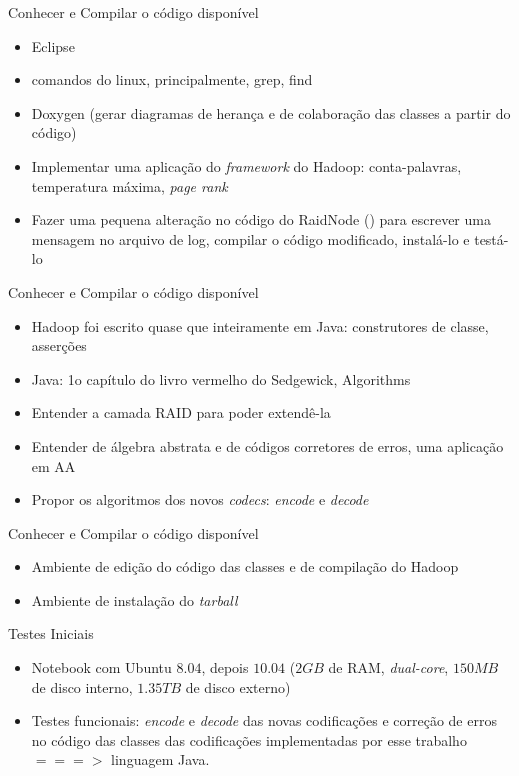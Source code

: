   \begin{frame}{Conhecer e Compilar o código disponível}
     \begin{itemize}
        \item<1-> Eclipse
        \item<2-> comandos do linux, principalmente, grep, find
        \item<3-> Doxygen (gerar diagramas de herança e de colaboração das classes a partir do código)
        \item<4-> Implementar uma aplicação do \emph{framework} do Hadoop: conta-palavras, temperatura máxima, \emph{page rank}
        \item<5-> Fazer uma pequena alteração no código do RaidNode () para escrever uma mensagem no arquivo de log, compilar o código modificado, instalá-lo e testá-lo
     \end{itemize}
  \end{frame}

  \begin{frame}{Conhecer e Compilar o código disponível}
     \begin{itemize}
        \item<1-> Hadoop foi escrito quase que inteiramente em Java: construtores de classe, asserções
        \item<2-> Java: 1o capítulo do livro vermelho do Sedgewick, Algorithms
        \item<3-> Entender a camada RAID para poder extendê-la
        \item<4-> Entender de álgebra abstrata e de códigos corretores de erros, uma aplicação em AA
        \item<5-> Propor os algoritmos dos novos \emph{codecs}: \emph{encode} e \emph{decode}
     \end{itemize}
  \end{frame}

  \begin{frame}{Conhecer e Compilar o código disponível}
     \begin{itemize}
        \item<1-> Ambiente de edição do código das classes e de compilação do Hadoop 
        \item<2-> Ambiente de instalação do \emph{tarball}
     \end{itemize}
  \end{frame}

  \begin{frame}{Testes Iniciais}
     \begin{itemize}
        \item<1-> Notebook com Ubuntu $8.04$, depois $10.04$ ($2GB$ de RAM, \emph{dual-core}, $150MB$ de disco interno, $1.35TB$ de disco externo) 
        \item<2-> Testes funcionais: \emph{encode} e \emph{decode} das novas codificações e correção de erros no código das classes das codificações implementadas por esse trabalho $===>$ linguagem Java.
     \end{itemize}
  \end{frame}

